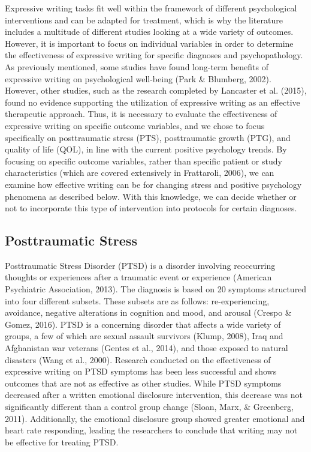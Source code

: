 \documentclass[english,man]{apa6}
\theoremstyle{definition}
\theoremstyle{definition}
\theoremstyle{definition}
\theoremstyle{remark}
\begin{document}
Expressive writing tasks fit well within the framework of different
psychological interventions and can be adapted for treatment, which is
why the literature includes a multitude of different studies looking at
a wide variety of outcomes. However, it is important to focus on
individual variables in order to determine the effectiveness of
expressive writing for specific diagnoses and psychopathology. As
previously mentioned, some studies have found long-term benefits of
expressive writing on psychological well-being (Park \& Blumberg, 2002).
However, other studies, such as the research completed by Lancaster et
al. (2015), found no evidence supporting the utilization of expressive
writing as an effective therapeutic approach. Thus, it is necessary to
evaluate the effectiveness of expressive writing on specific outcome
variables, and we chose to focus specifically on posttraumatic stress
(PTS), posttraumatic growth (PTG), and quality of life (QOL), in line
with the current positive psychology trends. By focusing on specific
outcome variables, rather than specific patient or study characteristics
(which are covered extensively in Frattaroli, 2006), we can examine how
effective writing can be for changing stress and positive psychology
phenomena as described below. With this knowledge, we can decide whether
or not to incorporate this type of intervention into protocols for
certain diagnoses.

\subsection{Posttraumatic Stress}\label{posttraumatic-stress}

Posttraumatic Stress Disorder (PTSD) is a disorder involving reoccurring
thoughts or experiences after a traumatic event or experience (American
Psychiatric Association, 2013). The diagnosis is based on 20 symptoms
structured into four different subsets. These subsets are as follows:
re-experiencing, avoidance, negative alterations in cognition and mood,
and arousal (Crespo \& Gomez, 2016). PTSD is a concerning disorder that
affects a wide variety of groups, a few of which are sexual assault
survivors (Klump, 2008), Iraq and Afghanistan war veterans (Gentes et
al., 2014), and those exposed to natural disasters (Wang et al., 2000).
Research conducted on the effectiveness of expressive writing on PTSD
symptoms has been less successful and shows outcomes that are not as
effective as other studies. While PTSD symptoms decreased after a
written emotional disclosure intervention, this decrease was not
significantly different than a control group change (Sloan, Marx, \&
Greenberg, 2011). Additionally, the emotional disclosure group showed
greater emotional and heart rate responding, leading the researchers to
conclude that writing may not be effective for treating PTSD.
\end{document}
